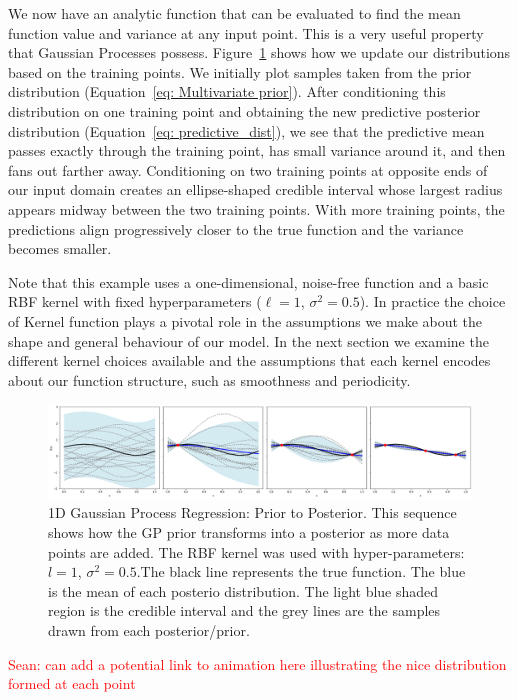 \documentclass[10pt]{article}
\newcommand{\Sean}[1]{{\textcolor{red}{{Sean: #1}} }}
\begin{document}
\noindent
We now have an analytic function that can be evaluated to find the mean function value and variance at any input point.
This is a very useful property that Gaussian Processes possess. Figure~\ref{fig: priortoposterior} shows how we update our
distributions based on the training points. We initially plot samples taken from the prior distribution (Equation~\ref{eq: Multivariate prior}). 
After conditioning this distribution on one training point and obtaining the new predictive posterior distribution (Equation~\ref{eq: predictive_dist}), 
we see that the predictive mean passes exactly through the training point, has small variance around it, and then fans out farther away. 
Conditioning on two training points at opposite ends of our input domain creates an ellipse-shaped credible interval whose largest radius 
appears midway between the two training points. With more training points, the predictions align progressively closer to the true function 
and the variance becomes smaller.

\noindent
Note that this example uses a one-dimensional, noise-free function and a basic RBF kernel with fixed hyperparameters (\(\ell = 1\), \(\sigma^2 = 0.5\)). 
In practice the choice of Kernel function plays a pivotal role in the assumptions we make about the shape and general behaviour of our model. In the next section
we examine the different kernel choices available and the assumptions that each kernel encodes about our function structure, such as smoothness and periodicity.



\begin{figure}[H]
    \centering
    \includegraphics[width=\textwidth]{LatexPlots/1dplots/priortoposterior.png}
    \caption{1D Gaussian Process Regression: Prior to Posterior. This sequence shows how the GP prior transforms into a posterior as more data points are added. 
    The RBF kernel was used with hyper-parameters: $l = 1$, $\sigma^2 = 0.5$.The black line represents the true function. The blue is the mean of each posterio distribution. 
    The light blue shaded region is the credible interval and the grey lines are the samples drawn from each posterior/prior. }
    \label{fig: priortoposterior}
\end{figure}
\Sean{can add a potential link to animation here illustrating the nice distribution formed at each point}
\end{document}
